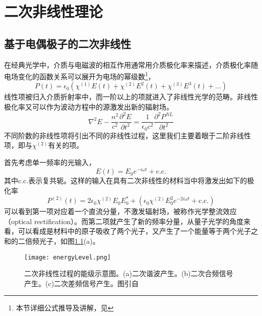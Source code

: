 \chapter{二次非线性理论}
\label{sec:nonlinearTheo}
\section{基于电偶极子的二次非线性}
\label{sec:dipole}
在经典光学中，介质与电磁波的相互作用通常用介质极化率来描述，介质极化率随电场变化的函数关系可以展开为电场的幂级数\footnote{本节详细公式推导及讲解，见\cite{boyd2003nonlinear}}，
\begin{equation}
P(t) = \epsilon_0(\chi^{(1)}E(t)+\chi^{(2)}E^2(t)+\chi^{(3)}E^3(t)+\dots)
\end{equation}
线性项被归入介质折射率中，而一阶以上的项就进入了非线性光学的范畴。非线性极化率又可以作为波动方程中的源激发出新的辐射场。
\begin{equation}
\nabla^2E-\frac{n^2}{c^2}\frac{\partial^2E}{\partial t^2} = \frac{1}{\epsilon_0c^2}\frac{\partial^2P^{NL}}{\partial t^2}
\label{eq:wave}
\end{equation}
不同阶数的非线性项将引出不同的非线性过程，这里我们主要着眼于二阶非线性项，即与$\chi^{(2)}$有关的项。

首先考虑单一频率的光输入，
\begin{equation}
E(t) = E_0e^{-i\omega t}+\textrm{c.c.} 
\end{equation}
	其中c.c.表示复共轭。这样的输入在具有二次非线性的材料当中将激发出如下的极化率
\begin{equation}
P^{(2)}(t) = 2\epsilon_0\chi^{(2)}E_0E_0^*+(\epsilon_0\chi^{(2)}E_0^2e^{-2i\omega t}+\textrm{c.c.})
\end{equation}
可以看到第一项对应着一个直流分量，不激发辐射场，被称作光学整流效应（optical rectification）。而第二项就产生了新的频率分量，从量子光学的角度来看，可以看成是材料中的原子吸收了两个光子，又产生了一个能量等于两个光子之和的二倍频光子，如图\ref{pic:energyLevel}(a)。

\begin{figure}
\centering
\texttt{[image: energyLevel.png]}
\caption{二次非线性过程的能级示意图。(a)二次谐波产生。(b)二次合频信号产生。(c)二次差频信号产生。图引自\cite{boyd2003nonlinear}}
\label{pic:energyLevel}
\end{figure}

